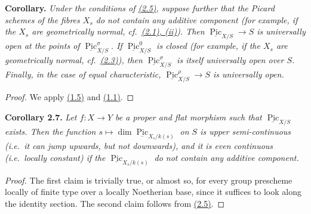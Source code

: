 \documentclass{article}
\newenvironment{itenv}[1]
  {\phantomsection\par\smallskip\noindent\textbf{#1.}\itshape}
  {\par\smallskip}
\newcommand{\oldpage}[1]{\marginpar{\footnotesize$\Big\vert$ \textit{p.~#1}}}
\theoremstyle{definition}
\theoremstyle{definition}
\theoremstyle{definition}
\theoremstyle{definition}
\theoremstyle{remark}
\begin{document}
\leavevmode{}%
\begin{itenv}{Corollary}
Under the conditions of \protect\hyperlink{fga-3-vi-theorem-2.5}{(2.5)}, suppose further that the Picard schemes of the fibres \(X_s\) do not contain any additive component (for example, if the \(X_s\) are geometrically normal, cf.~\protect\hyperlink{fga-3-vi-theorem-2.1}{(2.1), (ii)}).
Then \(\underline{\operatorname{Pic}}_{X/S}\to S\) is universally open at the points of \(\underline{\operatorname{Pic}}_{X/S}^\sigma\).
If \(\underline{\operatorname{Pic}}_{X/S}^0\) is closed (for example, if the \(X_s\) are geometrically normal, cf.~\protect\hyperlink{fga-3-vi-corollary-2.3}{(2.3)}), then \(\underline{\operatorname{Pic}}_{X/S}^\sigma\) is itself universally open over \(S\).
Finally, in the case of equal characteristic, \(\underline{\operatorname{Pic}}_{X/S}^\rho\to S\) is universally open.

\end{itenv}

\begin{proof}
We apply \protect\hyperlink{fga-3-vi-corollary-1.5}{(1.5)} and \protect\hyperlink{fga-3-vi-theorem-1.1}{(1.1)}.
\end{proof}

\leavevmode{}%
\begin{itenv}{Corollary 2.7}
\oldpage{236-14}Let \(f\colon X\to Y\) be a proper and flat morphism such that \(\underline{\operatorname{Pic}}_{X/S}\) exists.
Then the function \(s\mapsto\dim\underline{\operatorname{Pic}}_{X_s/k(s)}\) on \(S\) is upper semi-continuous (i.e.~it can jump upwards, but not downwards), and it is even continuous (i.e.~locally constant) if the \(\underline{\operatorname{Pic}}_{X_s/k(s)}\) do not contain any additive component.

\end{itenv}

\begin{proof}
The first claim is trivially true, or almost so, for every group prescheme locally of finite type over a locally Noetherian base, since it suffices to look along the identity section.
The second claim follows from \protect\hyperlink{fga-3-vi-theorem-2.5}{(2.5)}.
\end{proof}
\end{document}
